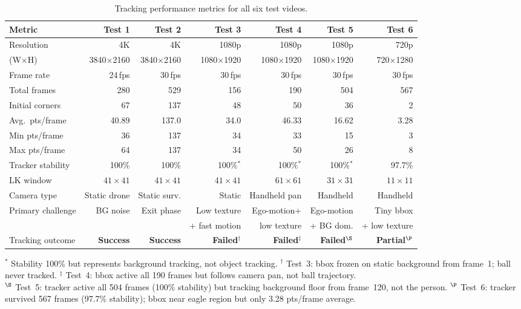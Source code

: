 \documentclass[12pt,a4paper]{article}
\begin{document}
\begin{table}[H]
\centering\small
\caption{Tracking performance metrics for all six test videos.}
\label{tab:quant}
\renewcommand{\arraystretch}{1.12}
\begin{tabularx}{\textwidth}{lRRRRRR}
\toprule
{}
\textbf{Metric} & \textbf{Test 1} & \textbf{Test 2} & \textbf{Test 3} & \textbf{Test 4} & \textbf{Test 5} & \textbf{Test 6} \\
\midrule
Resolution & 4K & 4K & 1080p & 1080p & 1080p & 720p \\
\quad (W$\times$H) & 3840$\times$2160 & 3840$\times$2160 & 1080$\times$1920 & 1080$\times$1920 & 1080$\times$1920 & 720$\times$1280 \\
Frame rate & 24\,fps & 30\,fps & 30\,fps & 30\,fps & 30\,fps & 30\,fps \\
Total frames & 280 & 529 & 156 & 190 & 504 & 567 \\
Initial corners & 67 & 137 & 48 & 50 & 36 & 2 \\
Avg.\ pts/frame & 40.89 & 137.0 & 34.0 & 46.33 & 16.62 & 3.28 \\
Min pts/frame & 36 & 137 & 34 & 33 & 15 & 3 \\
Max pts/frame & 64 & 137 & 34 & 50 & 26 & 8 \\
Tracker stability & 100\% & 100\% & 100\%$^*$ & 100\%$^*$ & 100\%$^*$ & 97.7\% \\
LK window & $41\times41$ & $41\times41$ & $41\times41$ & $61\times61$ & $31\times31$ & $11\times11$ \\
Camera type & Static drone & Static surv. & Static & Handheld pan & Handheld & Handheld \\
Primary challenge & BG noise & Exit phase & Low texture & Ego-motion+ & Ego-motion & Tiny bbox \\
 & & & + fast motion & low texture & + BG dom. & + low texture \\
Tracking outcome & \textbf{Success} & \textbf{Success} & \textbf{Failed}$^\dagger$ & \textbf{Failed}$^\ddagger$ & \textbf{Failed}$^\S$ & \textbf{Partial}$^\P$ \\
\bottomrule
\end{tabularx}
\vspace{2pt}
\begin{minipage}{\textwidth}
\scriptsize
$^*$ Stability 100\% but represents background tracking, not object tracking.\quad
$^\dagger$ Test~3: bbox frozen on static background from frame~1; ball never tracked.\quad
$^\ddagger$ Test~4: bbox active all 190 frames but follows camera pan, not ball trajectory.\\
$^\S$ Test~5: tracker active all 504 frames (100\% stability) but tracking background floor from frame~120, not the person.\quad
$^\P$ Test~6: tracker survived 567 frames (97.7\% stability); bbox near eagle region but only 3.28 pts/frame average.
\end{minipage}
\end{table}
\end{document}
